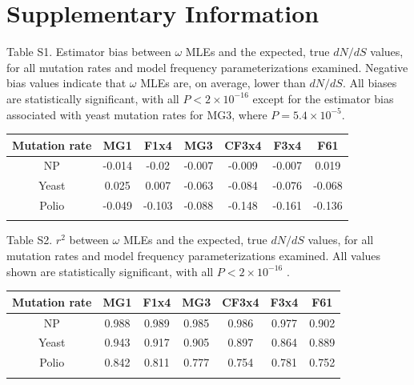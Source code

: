 \documentclass[11pt]{article}
\begin{document}
\clearpage

	
\section*{Supplementary Information}

\vspace{2cm}

\noindent Table S1. Estimator bias between $\omega$ MLEs and the expected, true $dN/dS$ values, for all mutation rates and model frequency parameterizations examined. Negative bias values indicate that $\omega$ MLEs are, on average, lower than $dN/dS$. All biases are statistically significant, with all $P < 2\times10^{-16}$ except for the estimator bias associated with yeast mutation rates for MG3, where $P = 5.4\times10^{-5}$.
\begin{table}[htbp]
	\begin{tabular}{c c c c c c c}
		\hline\noalign{\smallskip}
		Mutation rate & MG1 & F1x4 & MG3 & CF3x4 & F3x4 & F61 \\
		\hline\noalign{\smallskip}
		NP & -0.014 & -0.02 & -0.007 & -0.009 & -0.007 & 0.019 \\ 
		Yeast & 0.025 & 0.007 & -0.063 & -0.084 & -0.076 & -0.068 \\ 
		Polio & -0.049 & -0.103 & -0.088 & -0.148 & -0.161 & -0.136 \\ 
		\noalign{\smallskip}\hline\noalign{\smallskip}
	\end{tabular}
\end{table}	


\vspace{2cm}

\noindent Table S2. $r^2$ between $\omega$ MLEs and the expected, true $dN/dS$ values, for all mutation rates and model frequency parameterizations examined. All values shown are statistically significant, with all $P < 2\times10^{-16}$ .
\begin{table}[htbp]
	\begin{tabular}{c c c c c c c}
		\hline\noalign{\smallskip}
		Mutation rate & MG1 & F1x4 & MG3 & CF3x4 & F3x4 & F61 \\
		\hline\noalign{\smallskip}
		NP & 0.988 & 0.989 & 0.985 & 0.986 & 0.977 & 0.902 \\ 
		Yeast & 0.943 & 0.917 & 0.905 & 0.897 & 0.864 & 0.889 \\ 
		Polio & 0.842 & 0.811 & 0.777 & 0.754 & 0.781 & 0.752 \\ 
		\noalign{\smallskip}\hline\noalign{\smallskip}
	\end{tabular}
\end{table}	
\end{document}

